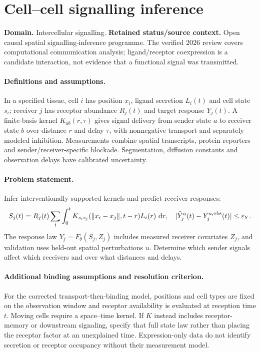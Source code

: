 \documentclass[11pt]{article}
\begin{document}
\section*{Cell–cell signalling inference}
\label{prob:050}
\label{rank:62}
\par\smallskip

\noindent\textbf{Domain.} Intercellular signalling. \quad \textbf{Retained status/source context.} Open causal spatial signalling-inference programme. The verified 2026 review covers computational communication analysis; ligand/receptor coexpression is a candidate interaction, not evidence that a functional signal was transmitted.
\paragraph{Definitions and assumptions.} In a specified tissue, cell $i$ has position $x_i$, ligand secretion $L_i(t)$ and cell state $s_i$; receiver $j$ has receptor abundance $R_j(t)$ and target response $Y_j(t)$. A finite-basis kernel $K_{ab}(r,\tau)$ gives signal delivery from sender state $a$ to receiver state $b$ over distance $r$ and delay $\tau$, with nonnegative transport and separately modeled inhibition. Measurements combine spatial transcripts, protein reporters and sender/receiver-specific blockade. Segmentation, diffusion constants and observation delays have calibrated uncertainty.
\paragraph{Problem statement.} Infer interventionally supported kernels and predict receiver responses:
\[
S_j(t)=R_j(t)\sum_i\int_0^tK_{s_i s_j}(\|x_i-x_j\|,t-r)L_i(r)\,\,\mathrm{d} r,
\quad |\widehat Y_j^u(t)-Y_j^{u,\rm obs}(t)|\leq\varepsilon_Y.
\]
The response law $Y_j=F_\theta(S_j,Z_j)$ includes measured receiver covariates $Z_j$, and validation uses held-out spatial perturbations $u$. Determine which sender signals affect which receivers and over what distances and delays.
\paragraph{Additional binding assumptions and resolution criterion.} For the corrected transport-then-binding model, positions and cell types are fixed on the observation window and receptor availability is evaluated at reception time $t$. Moving cells require a space--time kernel. If $K$ instead includes receptor-memory or downstream signaling, specify that full state law rather than placing the receptor factor at an unexplained time. Expression-only data do not identify secretion or receptor occupancy without their measurement model.
\end{document}
